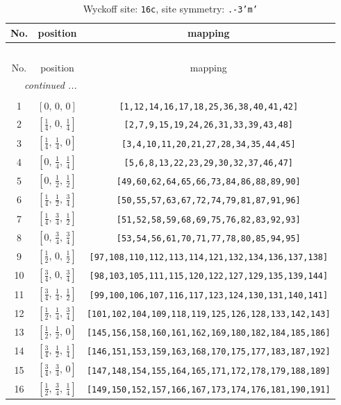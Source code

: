 \documentclass[fleqn,8pt]{jsarticle}
\begin{document}
\begin{longtable}{ccc}
\caption{Wyckoff site: {\tt 16c}, site symmetry: {\tt .-3'm'}}
 \\
 \hline \hline
No. & position & mapping \\ \hline \endfirsthead

\multicolumn{2}{l}{\tablename\ \thetable{}} \\
 \hline \hline
No. & position & mapping \\ \hline \endhead

 \hline \hline
\multicolumn{2}{r}{\footnotesize\it continued ...} \\ \endfoot

 \hline \hline
\multicolumn{2}{r}{} \\ \endlastfoot

1 & $\left[ 0,\, 0,\, 0 \right]$ & {\tt [1,12,14,16,17,18,25,36,38,40,41,42]} \\ \hline
2 & $\left[ \frac{1}{4},\, 0,\, \frac{1}{4} \right]$ & {\tt [2,7,9,15,19,24,26,31,33,39,43,48]} \\ \hline
3 & $\left[ \frac{1}{4},\, \frac{1}{4},\, 0 \right]$ & {\tt [3,4,10,11,20,21,27,28,34,35,44,45]} \\ \hline
4 & $\left[ 0,\, \frac{1}{4},\, \frac{1}{4} \right]$ & {\tt [5,6,8,13,22,23,29,30,32,37,46,47]} \\ \hline
5 & $\left[ 0,\, \frac{1}{2},\, \frac{1}{2} \right]$ & {\tt [49,60,62,64,65,66,73,84,86,88,89,90]} \\ \hline
6 & $\left[ \frac{1}{4},\, \frac{1}{2},\, \frac{3}{4} \right]$ & {\tt [50,55,57,63,67,72,74,79,81,87,91,96]} \\ \hline
7 & $\left[ \frac{1}{4},\, \frac{3}{4},\, \frac{1}{2} \right]$ & {\tt [51,52,58,59,68,69,75,76,82,83,92,93]} \\ \hline
8 & $\left[ 0,\, \frac{3}{4},\, \frac{3}{4} \right]$ & {\tt [53,54,56,61,70,71,77,78,80,85,94,95]} \\ \hline
9 & $\left[ \frac{1}{2},\, 0,\, \frac{1}{2} \right]$ & {\tt [97,108,110,112,113,114,121,132,134,136,137,138]} \\ \hline
10 & $\left[ \frac{3}{4},\, 0,\, \frac{3}{4} \right]$ & {\tt [98,103,105,111,115,120,122,127,129,135,139,144]} \\ \hline
11 & $\left[ \frac{3}{4},\, \frac{1}{4},\, \frac{1}{2} \right]$ & {\tt [99,100,106,107,116,117,123,124,130,131,140,141]} \\ \hline
12 & $\left[ \frac{1}{2},\, \frac{1}{4},\, \frac{3}{4} \right]$ & {\tt [101,102,104,109,118,119,125,126,128,133,142,143]} \\ \hline
13 & $\left[ \frac{1}{2},\, \frac{1}{2},\, 0 \right]$ & {\tt [145,156,158,160,161,162,169,180,182,184,185,186]} \\ \hline
14 & $\left[ \frac{3}{4},\, \frac{1}{2},\, \frac{1}{4} \right]$ & {\tt [146,151,153,159,163,168,170,175,177,183,187,192]} \\ \hline
15 & $\left[ \frac{3}{4},\, \frac{3}{4},\, 0 \right]$ & {\tt [147,148,154,155,164,165,171,172,178,179,188,189]} \\ \hline
16 & $\left[ \frac{1}{2},\, \frac{3}{4},\, \frac{1}{4} \right]$ & {\tt [149,150,152,157,166,167,173,174,176,181,190,191]} \\
\end{longtable}
\end{document}
